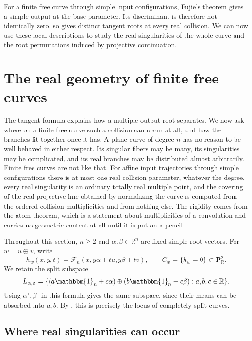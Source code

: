 \documentclass[12pt,reqno]{amsart}
\theoremstyle{definition}
\theoremstyle{remark}
\newcommand{\R}{\mathbb R}
\newcommand{\one}{\mathbbm{1}_n}
\begin{document}
For a finite free curve through simple input configurations, Fujie’s theorem gives a simple output at the base parameter. Its discriminant is therefore not identically zero, so  gives distinct tangent roots at every real collision. We can now use these local descriptions to study the real singularities of the whole curve and the root permutations induced by projective continuation.

\section{The real geometry of finite free curves}
\label{sec:collision-geometry}
The tangent formula explains how a multiple output root separates.  We now
ask where on a finite free curve such a collision can occur at all, and how the branches fit together once it has. A plane curve of degree \(n\) has no reason to be well behaved in either respect. Its singular fibers may be many, its singularities may be complicated, and its real branches may be distributed almost arbitrarily. Finite free curves are not like that. For affine input trajectories through simple configurations there is at most one real collision parameter, whatever the degree, every real singularity is an ordinary totally real multiple point, and the covering of the real projective line obtained by normalizing the curve is computed from the ordered collision multiplicities and from nothing else. The rigidity comes from the atom theorem, which is a statement about multiplicities of a convolution and carries no geometric content at all until it is put on a pencil.

Throughout this section, \(n\geq2\) and \(\alpha,\beta\in\R^n\)
are fixed simple root vectors.  For \(w=u\oplus v\), write
\[
 h_w(x,y,t)=\mathcal F_n(x,y\alpha+tu,y\beta+tv),
 \qquad C_w=\{h_w=0\}\subset\mathbf P^2_{\R}.
\]
We retain the split subspace
\begin{equation}\label{eq:global-collision-split-space}
 L_{\alpha,\beta}
 =\{(a\one+c\alpha)\oplus(b\one+c\beta):a,b,c\in\R\}.
\end{equation}
Using \(\alpha^\circ,\beta^\circ\) in this formula gives the same
subspace, since their means can be absorbed into \(a,b\).  By
, this is precisely the locus of completely
split curves.

\subsection{Where real singularities can occur}
\end{document}

